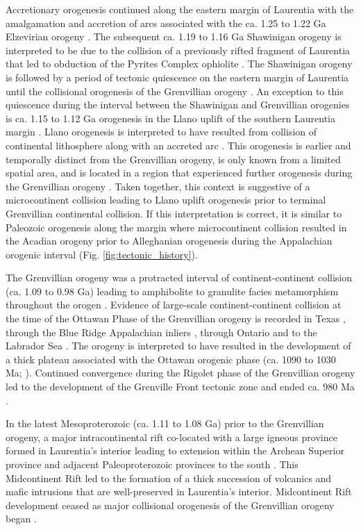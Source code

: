 \documentclass[twocolumn, switch]{article} %
\begin{document}
Accretionary orogenesis continued along the eastern margin of Laurentia with the amalgamation and accretion of arcs associated with the ca. 1.25 to 1.22 Ga Elzevirian orogeny \citep{McLelland2013a}. The subsequent ca. 1.19 to 1.16 Ga Shawinigan orogeny is interpreted to be due to the collision of a previously rifted fragment of Laurentia that led to obduction of the Pyrites Complex ophiolite \citep{McLelland2010a, Chiarenzelli2011a}. The Shawinigan orogeny is followed by a period of tectonic quiescence on the eastern margin of Laurentia until the collisional orogenesis of the Grenvillian orogeny \citep{McLelland2010a}. An exception to this quiescence during the interval between the Shawinigan and Grenvillian orogenies is ca. 1.15 to 1.12 Ga orogenesis in the Llano uplift of the southern Laurentia margin \citep{Mosher1998a}. Llano orogenesis is interpreted to have resulted from collision of continental lithosphere along with an accreted arc \citep{Mosher1998a}. This orogenesis is earlier and temporally distinct from the Grenvillian orogeny, is only known from a limited spatial area, and is located in a region that experienced further orogenesis during the Grenvillian orogeny \citep{Grimes2004a}. Taken together, this context is suggestive of a microcontinent collision leading to Llano uplift orogenesis prior to terminal Grenvillian continental collision. If this interpretation is correct, it is similar to Paleozoic orogenesis along the margin where microcontinent collision resulted in the Acadian orogeny prior to Alleghanian orogenesis during the Appalachian orogenic interval (Fig. \ref{fig:tectonic_history}).

The Grenvillian orogeny was a protracted interval of continent-continent collision (ca. 1.09 to 0.98 Ga) leading to amphibolite to granulite facies metamorphism throughout the orogen \citep{McLelland2010a}. Evidence of large-scale continent-continent collision at the time of the Ottawan Phase of the Grenvillian orogeny is recorded in Texas \citep{Grimes2004a}, through the Blue Ridge Appalachian inliers \citep{Johnson2020a}, through Ontario and to the Labrador Sea \citep{Rivers2008a}. The orogeny is interpreted to have resulted in the development of a thick plateau associated with the Ottawan orogenic phase (ca. 1090 to 1030 Ma; \citealp{Rivers2008a}). Continued convergence during the Rigolet phase of the Grenvillian orogeny led to the development of the Grenville Front tectonic zone and ended ca. 980 Ma \citep{Hynes2010a}.

In the latest Mesoproterozoic (ca. 1.11 to 1.08 Ga) prior to the Grenvillian orogeny, a major intracontinental rift co-located with a large igneous province formed in Laurentia's interior leading to extension within the Archean Superior province and adjacent Paleoproterozoic provinces to the south \citep{Cannon1992b}. This Midcontinent Rift led to the formation of a thick succession of volcanics and mafic intrusions that are well-preserved in Laurentia's interior. Midcontinent Rift development ceased as major collisional orogenesis of the Grenvillian orogeny began \citep{Cannon1994a, Swanson-Hysell2019a}.
\end{document}
